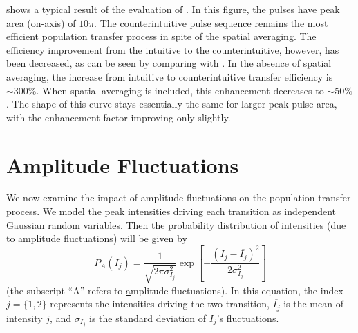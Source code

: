 \begin{figure}[tbp]
\bigskip
{}
\end{figure}

 shows a typical result of the evaluation of . 
In this figure, the pulses have peak area (on-axis) of $10\pi$.  The
counterintuitive pulse sequence remains the most efficient population transfer
process in spite of the spatial averaging.  The efficiency improvement from the
intuitive to the counterintuitive, however, has been decreased, as can be seen
by comparing  with .  In the absence of spatial
averaging, the increase from intuitive to counterintuitive transfer efficiency
is $\sim 300\%$.  When spatial averaging is included, this enhancement
decreases to $ \sim 50\%$.  The shape of this curve stays essentially the same
for larger peak pulse area, with the enhancement factor improving only slightly.


\section{Amplitude Fluctuations}

\hspace{\parindent} We now examine the impact of amplitude fluctuations on
the population transfer process.  We model the peak intensities driving 
each transition as independent Gaussian random variables.  Then the
probability distribution of intensities (due to amplitude
fluctuations) will be given by
\begin{equation}
P_A(I_j) = \frac{1}{\sqrt{2\pi\sigma_{I_j}^2}}\exp\left[-\frac{(I_j
-\overline{I_j})^2}{2 \sigma_{I_j}^2}\right]
\end{equation}
(the subscript ``A'' refers to \underline{a}mplitude fluctuations).
In this equation, the index $j =\{1,2\}$ represents the intensities driving
the two transition,
$\overline{I_j}$ is the mean of intensity $j$, and $\sigma_{I_j}$
is the standard deviation of $I_j$'s fluctuations.

